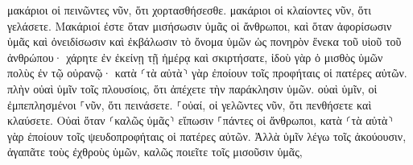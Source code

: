 \documentclass{openreader}
\begin{document}
μακάριοι οἱ πεινῶντες νῦν, ὅτι χορτασθήσεσθε. μακάριοι οἱ κλαίοντες νῦν, ὅτι γελάσετε. 
Μακάριοί ἐστε ὅταν μισήσωσιν ὑμᾶς οἱ ἄνθρωποι, καὶ ὅταν ἀφορίσωσιν ὑμᾶς καὶ ὀνειδίσωσιν καὶ ἐκβάλωσιν τὸ ὄνομα ὑμῶν ὡς πονηρὸν ἕνεκα τοῦ υἱοῦ τοῦ ἀνθρώπου· 
χάρητε ἐν ἐκείνῃ τῇ ἡμέρᾳ καὶ σκιρτήσατε, ἰδοὺ γὰρ ὁ μισθὸς ὑμῶν πολὺς ἐν τῷ οὐρανῷ· κατὰ ⸂τὰ αὐτὰ⸃ γὰρ ἐποίουν τοῖς προφήταις οἱ πατέρες αὐτῶν. 
πλὴν οὐαὶ ὑμῖν τοῖς πλουσίοις, ὅτι ἀπέχετε τὴν παράκλησιν ὑμῶν. 
οὐαὶ ὑμῖν, οἱ ἐμπεπλησμένοι ⸀νῦν, ὅτι πεινάσετε. ⸀οὐαί, οἱ γελῶντες νῦν, ὅτι πενθήσετε καὶ κλαύσετε. 
Οὐαὶ ὅταν ⸂καλῶς ὑμᾶς⸃ εἴπωσιν ⸀πάντες οἱ ἄνθρωποι, κατὰ ⸂τὰ αὐτὰ⸃ γὰρ ἐποίουν τοῖς ψευδοπροφήταις οἱ πατέρες αὐτῶν. 
Ἀλλὰ ὑμῖν λέγω τοῖς ἀκούουσιν, ἀγαπᾶτε τοὺς ἐχθροὺς ὑμῶν, καλῶς ποιεῖτε τοῖς μισοῦσιν ὑμᾶς, 
\end{document}

